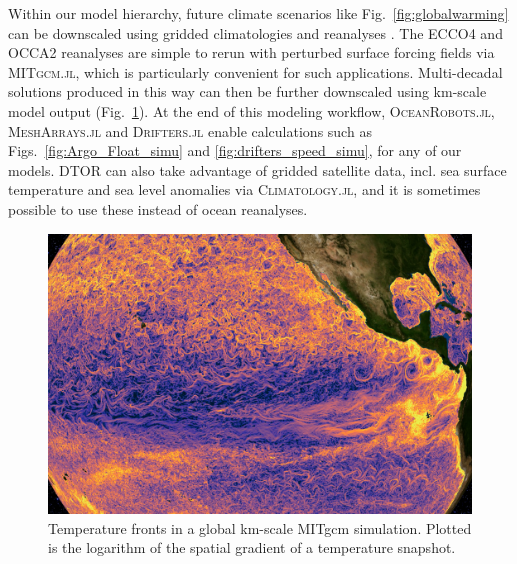 \documentclass{juliacon}[12pt]
\newcommand{\pkg}[1]{{\small \textsc{#1}}}
\begin{document}
Within our model hierarchy, future climate scenarios like Fig.~\ref{fig:globalwarming} can be downscaled using gridded climatologies and reanalyses \cite{Forget2010,Forget2015a,Forget2024a}. The ECCO4 and OCCA2 reanalyses are simple to rerun with perturbed surface forcing fields via \pkg{MITgcm.jl}, which is particularly convenient for such applications. Multi-decadal solutions produced in this way can then be further downscaled using km-scale model output (Fig.~\ref{fig:km_scale}). At the end of this modeling workflow, \pkg{OceanRobots.jl}, \pkg{MeshArrays.jl} and \pkg{Drifters.jl} enable calculations such as Figs.~\ref{fig:Argo_Float_simu} and \ref{fig:drifters_speed_simu}, for any of our models. DTOR can also take advantage of gridded satellite data, incl. sea surface temperature and sea level anomalies via \pkg{Climatology.jl}, and it is sometimes possible to use these instead of ocean reanalyses.

\begin{figure}[th]
\centerline{\includegraphics[width=\columnwidth]{figs/Snapshot_grad_theta.png}}
\caption{Temperature fronts in a global km-scale MITgcm simulation. Plotted is the logarithm of the spatial gradient of a temperature snapshot.}
\label{fig:km_scale}
\end{figure}
\end{document}
